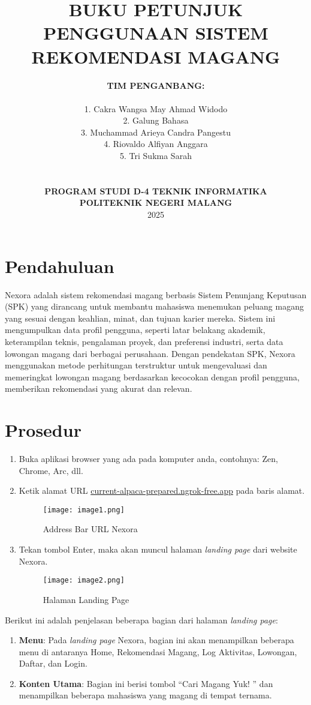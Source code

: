\documentclass[a4paper,12pt]{article}
\title{\textbf{BUKU PETUNJUK PENGGUNAAN SISTEM REKOMENDASI MAGANG}}
\author{
    \textbf{TIM PENGANBANG:} \\
    \begin{tabular}{l}
        1. Cakra Wangsa May Ahmad Widodo \\
        2. Galung Bahasa \\
        3. Muchammad Arieya Candra Pangestu \\
        4. Riovaldo Alfiyan Anggara \\
        5. Tri Sukma Sarah \\
    \end{tabular} \\
    \vspace{1cm} \\
    \textbf{PROGRAM STUDI D-4 TEKNIK INFORMATIKA} \\
    \textbf{POLITEKNIK NEGERI MALANG} \\
    2025
}
\date{}
\begin{document}
\maketitle
\thispagestyle{empty}
\clearpage

\tableofcontents
\clearpage

\listoffigures
\clearpage

\section{Pendahuluan}
Nexora adalah sistem rekomendasi magang berbasis Sistem Penunjang Keputusan (SPK) yang dirancang untuk membantu mahasiswa menemukan peluang magang yang sesuai dengan keahlian, minat, dan tujuan karier mereka. Sistem ini mengumpulkan data profil pengguna, seperti latar belakang akademik, keterampilan teknis, pengalaman proyek, dan preferensi industri, serta data lowongan magang dari berbagai perusahaan. Dengan pendekatan SPK, Nexora menggunakan metode perhitungan terstruktur untuk mengevaluasi dan memeringkat lowongan magang berdasarkan kecocokan dengan profil pengguna, memberikan rekomendasi yang akurat dan relevan.

\section{Prosedur}
\begin{enumerate}[label=\arabic*.]
    \item Buka aplikasi browser yang ada pada komputer anda, contohnya: Zen, Chrome, Arc, dll.
    \item Ketik alamat URL \url{current-alpaca-prepared.ngrok-free.app} pada baris alamat.
    \begin{figure}[h]
        \centering
        \texttt{[image: image1.png]}
        \caption{Address Bar URL Nexora}
        \label{fig:address-bar}
    \end{figure}
    \item Tekan tombol Enter, maka akan muncul halaman \textit{landing page} dari website Nexora.
    \begin{figure}[h]
        \centering
        \texttt{[image: image2.png]}
        \caption{Halaman Landing Page}
        \label{fig:landing-page}
    \end{figure}
\end{enumerate}

Berikut ini adalah penjelasan beberapa bagian dari halaman \textit{landing page}:
\begin{enumerate}[label=\arabic*.]
    \item \textbf{Menu}: Pada \textit{landing page} Nexora, bagian ini akan menampilkan beberapa menu di antaranya Home, Rekomendasi Magang, Log Aktivitas, Lowongan, Daftar, dan Login.
    \item \textbf{Konten Utama}: Bagian ini berisi tombol ``Cari Magang Yuk! '' dan menampilkan beberapa mahasiswa yang magang di tempat ternama.
\end{enumerate}
\end{document}
